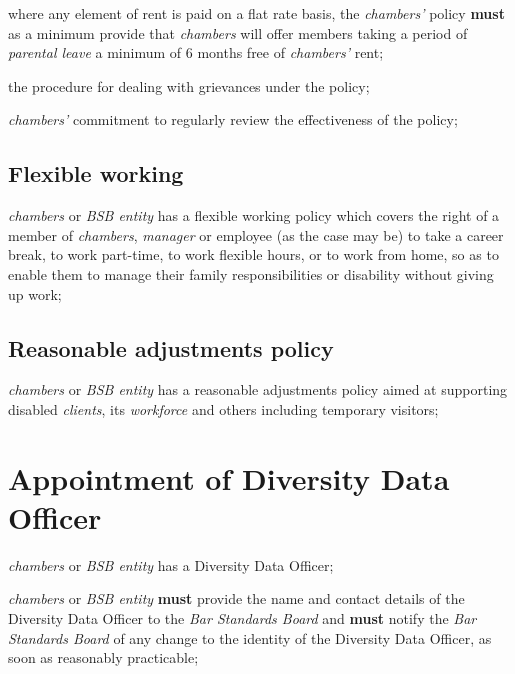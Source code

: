 \begin{numlist}
\begin{alphlist}
\begin{romlist}
\item where any element of rent is paid on a flat rate basis, the
\emph{chambers'} policy \textcolor{myred}{\textbf{must}} as a minimum provide that \emph{chambers}
will offer members taking a period of \emph{parental leave} a minimum of
6 months free of \emph{chambers'} rent;

\item the procedure for dealing with grievances under the policy;

\item \emph{chambers'} commitment to regularly review the effectiveness
of the policy;
\end{romlist}
\subsection{Flexible working}

\item \emph{chambers} or \emph{BSB entity} has a flexible working policy
which covers the right of a member of \emph{chambers}, \emph{manager} or
employee (as the case may be) to take a career break, to work part-time,
to work flexible hours, or to work from home, so as to enable them to
manage their family responsibilities or disability without giving up
work;

\subsection{Reasonable adjustments policy}

\item \emph{chambers} or \emph{BSB entity} has a reasonable adjustments
policy aimed at supporting disabled \emph{clients}, its \emph{workforce}
and others including temporary visitors;

\section{Appointment of Diversity Data Officer}

\item \emph{chambers} or \emph{BSB entity} has a Diversity Data Officer;

\item \emph{chambers} or \emph{BSB entity} \textcolor{myred}{\textbf{must}} provide the name and
contact details of the Diversity Data Officer to the \emph{Bar Standards
Board} and \textcolor{myred}{\textbf{must}} notify the \emph{Bar Standards Board} of any change to
the identity of the Diversity Data Officer, as soon as reasonably
practicable;


\end{alphlist}
\end{numlist}
